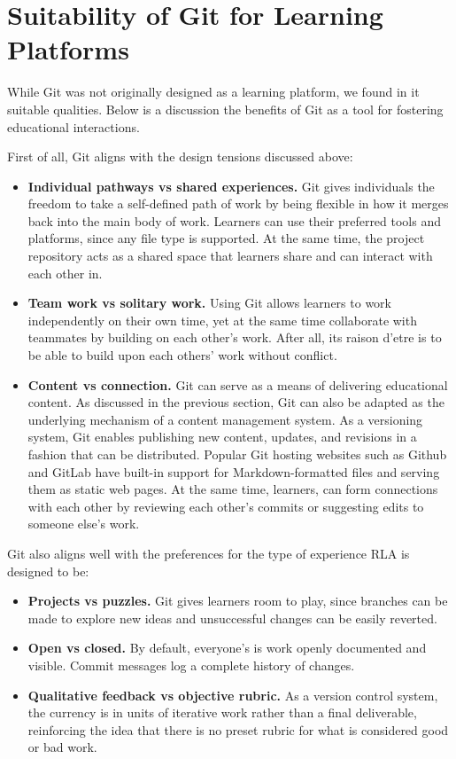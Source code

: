 \documentclass[12pt,twoside]{mitthesis}
\newcommand{\draft}[1]{{\color{blue} #1}}
\begin{document}
\section{Suitability of Git for Learning Platforms}

\draft{While Git was not originally designed as a learning platform, we found in it suitable qualities. Below is a discussion the benefits of Git as a tool for fostering educational interactions.

First of all, Git aligns with the design tensions discussed above: 
\begin{itemize}
\item \textbf{Individual pathways vs shared experiences.} Git gives individuals the freedom to take a self-defined path of work by being flexible in how it merges back into the main body of work. Learners can use their preferred tools and platforms, since any file type is supported. At the same time, the project repository acts as a shared space that learners share and can interact with each other in.
\item \textbf{Team work vs solitary work.} Using Git allows learners to work independently on their own time, yet at the same time collaborate with teammates by building on each other's work. After all, its raison d'etre is to be able to build upon each others' work without conflict.
\item \textbf{Content vs connection.} Git can serve as a means of delivering educational content. As discussed in the previous section, Git can also be adapted as the underlying mechanism of a content management system. As a versioning system, Git enables publishing new content, updates, and revisions in a fashion that can be distributed. Popular Git hosting websites such as Github and GitLab have built-in support for Markdown-formatted files and serving them as static web pages. At the same time, learners, can form connections with each other by reviewing each other's commits or suggesting edits to someone else's work. 
\end{itemize}

Git also aligns well with the preferences for the type of experience RLA is designed to be:
\begin{itemize}
\item \textbf{Projects vs puzzles.} Git gives learners room to play, since branches can be made to explore new ideas and unsuccessful changes can be easily reverted.  
\item \textbf{Open vs closed.} By default, everyone's is work openly documented and visible. Commit messages log a complete history of changes.
\item \textbf{Qualitative feedback vs objective rubric.} As a version control system, the currency is in units of iterative work rather than a final deliverable, reinforcing the idea that there is no preset rubric for what is considered good or bad work.
\end{itemize}

}
\end{document}
